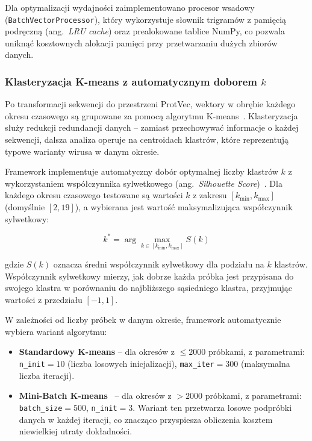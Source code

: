 Dla optymalizacji wydajności zaimplementowano procesor wsadowy (\texttt{BatchVectorProcessor}), który wykorzystuje słownik trigramów z pamięcią podręczną (ang.~\emph{LRU cache}) oraz prealokowane tablice NumPy, co pozwala uniknąć kosztownych alokacji pamięci przy przetwarzaniu dużych zbiorów danych.

\subsubsection{Klasteryzacja K-means z automatycznym doborem $k$}
\label{subsubsec:kmeans}

Po transformacji sekwencji do przestrzeni ProtVec, wektory w obrębie każdego okresu czasowego są grupowane za pomocą algorytmu K-means~\cite{macqueen1967kmeans}. Klasteryzacja służy redukcji redundancji danych -- zamiast przechowywać informacje o każdej sekwencji, dalsza analiza operuje na centroidach klastrów, które reprezentują typowe warianty wirusa w danym okresie.

Framework implementuje automatyczny dobór optymalnej liczby klastrów $k$ z wykorzystaniem współczynnika sylwetkowego (ang.~\emph{Silhouette Score})~\cite{rousseeuw1987silhouette}. Dla każdego okresu czasowego testowane są wartości $k$ z zakresu $[k_{\min}, k_{\max}]$ (domyślnie $[2, 19]$), a wybierana jest wartość maksymalizująca współczynnik sylwetkowy:

\begin{equation}
\label{eq:silhouette-impl}
k^{*} = \arg\max_{k \in [k_{\min}, k_{\max}]} S(k)
\end{equation}

\noindent gdzie $S(k)$ oznacza średni współczynnik sylwetkowy dla podziału na $k$ klastrów. Współczynnik sylwetkowy mierzy, jak dobrze każda próbka jest przypisana do swojego klastra w porównaniu do najbliższego sąsiedniego klastra, przyjmując wartości z przedziału $[-1, 1]$.

W zależności od liczby próbek w danym okresie, framework automatycznie wybiera wariant algorytmu:

\begin{itemize}
    \item \textbf{Standardowy K-means} -- dla okresów z $\leq 2000$ próbkami, z parametrami: \texttt{n\_init}$=10$ (liczba losowych inicjalizacji), \texttt{max\_iter}$=300$ (maksymalna liczba iteracji).
    \item \textbf{Mini-Batch K-means}~\cite{sculley2010minibatch} -- dla okresów z $> 2000$ próbkami, z parametrami: \texttt{batch\_size}$=500$, \texttt{n\_init}$=3$. Wariant ten przetwarza losowe podpróbki danych w każdej iteracji, co znacząco przyspiesza obliczenia kosztem niewielkiej utraty dokładności.
\end{itemize}

